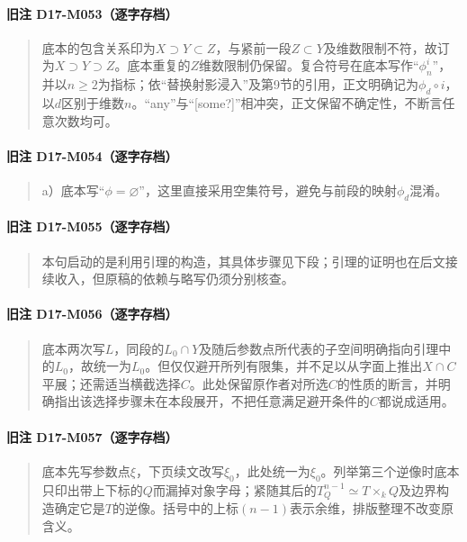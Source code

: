 \paragraph*{旧注 D17-M053（逐字存档）}
\begin{quote}
底本的包含关系印为$X\supset Y\subset Z$，与紧前一段$Z\subset Y$及维数限制不符，故订为$X\supset Y\supset Z$。底本重复的$Z$维数限制仍保留。复合符号在底本写作“$\phi_n^{i}$”，并以$n\geq2$为指标；依“替换射影浸入”及第9节的引用，正文明确记为$\phi_d\circ i$，以$d$区别于维数$n$。“any”与“[some?]”相冲突，正文保留不确定性，不断言任意次数均可。
\end{quote}

\paragraph*{旧注 D17-M054（逐字存档）}
\begin{quote}
a）底本写“$\phi=\varnothing$”，这里直接采用空集符号，避免与前段的映射$\phi_d$混淆。
\end{quote}

\paragraph*{旧注 D17-M055（逐字存档）}
\begin{quote}
本句启动的是利用引理的构造，其具体步骤见下段；引理的证明也在后文接续收入，但原稿的依赖与略写仍须分别核查。
\end{quote}

\paragraph*{旧注 D17-M056（逐字存档）}
\begin{quote}
底本两次写$L$，同段的$L_0\cap Y$及随后参数点所代表的子空间明确指向引理中的$L_0$，故统一为$L_0$。但仅仅避开所列有限集，并不足以从字面上推出$X\cap C$平展；还需适当横截选择$C$。此处保留原作者对所选$C$的性质的断言，并明确指出该选择步骤未在本段展开，不把任意满足避开条件的$C$都说成适用。
\end{quote}

\paragraph*{旧注 D17-M057（逐字存档）}
\begin{quote}
底本先写参数点$\xi$，下页续文改写$\xi_0$，此处统一为$\xi_0$。列举第三个逆像时底本只印出带上下标的$Q$而漏掉对象字母；紧随其后的$T_Q^{n-1}\simeq T\times_k Q$及边界构造确定它是$T$的逆像。括号中的上标$(n-1)$表示余维，排版整理不改变原含义。
\end{quote}

